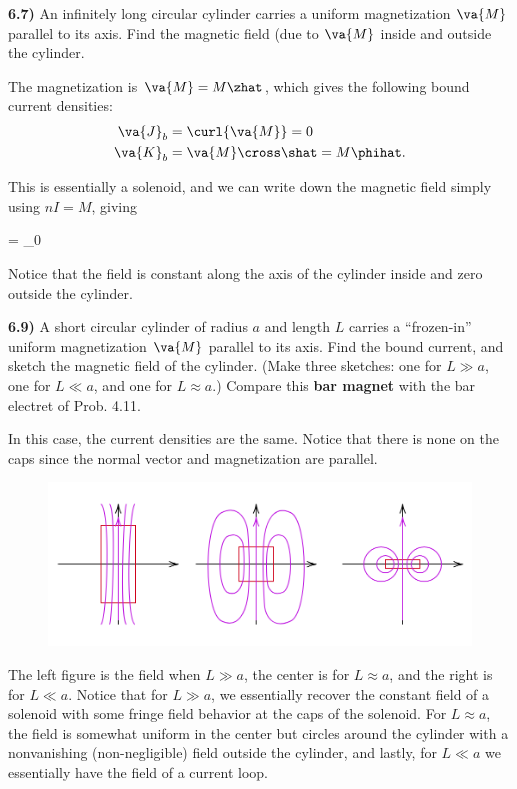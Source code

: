 \documentclass[12pt,a4paper]{article}
\newcommand{\prob}[2]{\textbf{#1)} #2}
\begin{document}
\prob{6.7}{
An infinitely long circular cylinder carries a uniform magnetization $\va{M}$ parallel to its axis.
Find the magnetic field (due to $\va{M}$ inside and outside the cylinder.
}

The magnetization is $\va{M} = M\zhat$, which gives the following bound current densities:
\begin{align*}
    \va{J}_{b} &= \curl{\va{M}} = 0 \\
    \va{K}_{b} &= \va{M} \cross \shat = M \phihat
.\end{align*}

This is essentially a solenoid, and we can write down the magnetic field simply using $nI = M$, giving
\begin{eqbox}
     = \mu_{0} 
\end{eqbox}

Notice that the field is constant along the axis of the cylinder inside and zero outside the cylinder.

\prob{6.9}{
A short circular cylinder of radius $a$ and length $L$ carries a ``frozen-in'' uniform magnetization $\va{M}$ parallel to its axis.
Find the bound current, and sketch the magnetic field of the cylinder. 
(Make three sketches: one for $L \gg a$, one for $L \ll a$, and one for $L \approx a$.)
Compare this \textbf{bar magnet} with the bar electret of Prob. 4.11.
}

In this case, the current densities are the same.
Notice that there is none on the caps since the normal vector and magnetization are parallel.

\begin{figure}[H]
   \begin{center}
       \includegraphics[scale=0.45]{./fig1.png}
   \end{center} 
\end{figure}

The left figure is the field when $L \gg a$, the center is for $L \approx a$, and the right is for $L \ll a$.
Notice that for $L \gg a$, we essentially recover the constant field of a solenoid with some fringe field behavior at the caps of the solenoid.
For $L \approx a$, the field is somewhat uniform in the center but circles around the cylinder with a nonvanishing (non-negligible) field outside the cylinder, and lastly, for $L \ll a$ we essentially have the field of a current loop.
\end{document}
